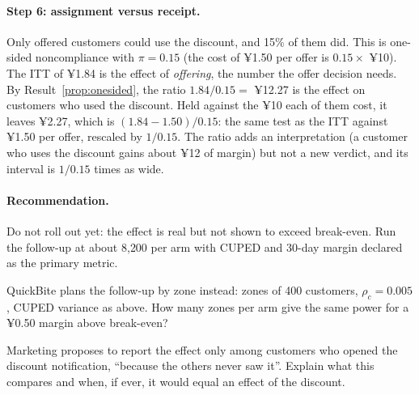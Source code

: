 \documentclass[11pt]{article}
\begin{document}
\paragraph{Step 6: assignment versus receipt.} Only offered customers could use the discount, and 15\% of them
did. This is one-sided noncompliance with $\pi = 0.15$ (the cost of ¥1.50 per offer is $0.15 \times$ ¥10). The ITT of
¥1.84 is the effect of \emph{offering}, the number the offer decision needs. By
Result~\ref{prop:onesided}, the ratio $1.84/0.15 = $ ¥12.27 is the effect on customers who used the discount.
Held against the ¥10 each of them cost, it leaves ¥2.27, which is $(1.84 - 1.50)/0.15$: the same test as the ITT
against ¥1.50 per offer, rescaled by $1/0.15$. The ratio adds an interpretation (a customer who uses the
discount gains about ¥12 of margin) but not a new verdict, and its interval is $1/0.15$ times as wide.

\paragraph{Recommendation.} Do not roll out yet: the effect is real but not shown to exceed break-even. Run the
follow-up at about 8{,}200 per arm with CUPED and 30-day margin declared as the primary metric.

\begin{exercise}[computation]
QuickBite plans the follow-up by zone instead: zones of 400 customers, $\rho_c = 0.005$, CUPED variance as
above. How many zones per arm give the same power for a ¥0.50 margin above break-even?
\end{exercise}

\begin{exercise}[judgment]
Marketing proposes to report the effect only among customers who opened the discount notification, ``because
the others never saw it''. Explain what this compares and when, if ever, it would equal an effect of the
discount.
\end{exercise}
\end{document}
